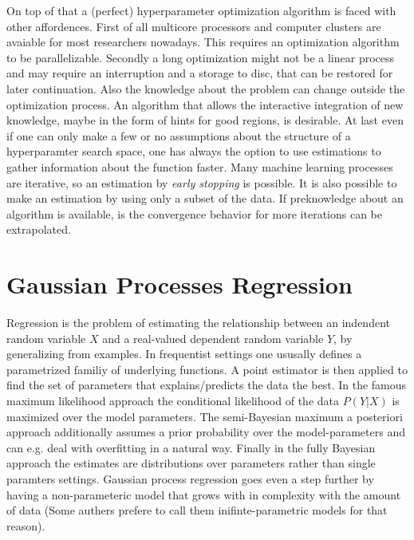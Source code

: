 \documentclass[english]{article}
\begin{document}
On top of that a (perfect) hyperparameter optimization algorithm is faced with other affordences. First of all multicore processors and computer clusters are avaiable for most researchers nowadays. This requires an optimization algorithm to be parallelizable. Secondly a long optimization might not be a linear process and may require an interruption and a storage to disc, that can be restored for later continuation. Also the knowledge about the problem can change outside the optimization process. An algorithm that allows the interactive integration of new knowledge, maybe in the form of hints for good regions, is desirable.
At last even if one can only make a few or no assumptions about the structure of a hyperparamter search space, one has always the option to use estimations to gather information about the function faster. Many machine learning processes are iterative, so an estimation by \textit{early stopping} is possible. It is also possible to make an estimation by using only a subset of the data. If preknowledge about an algorithm is available, is the convergence behavior for more iterations can be extrapolated.



\section{Gaussian Processes Regression}
\label{GPR}
Regression is the problem of estimating the relationship between an indendent random variable $X$ and a real-valued dependent random variable $Y$, by generalizing from examples. In frequentist settings one ususally defines a parametrized familiy of underlying functions. A point estimator is then applied to find the set of parameters that explains/predicts the data the best. In the famous maximum likelihood approach the conditional likelihood of the data $P(Y|X)$ is maximized over the model parameters. The semi-Bayesian maximum a posteriori approach additionally assumes a prior probability over the model-parameters and can e.g. deal with overfitting in a natural way. Finally in the fully Bayesian approach the estimates are distributions over parameters rather than single paramters settings. Gaussian process regression goes even a step further by having a non-parameteric model that grows with in complexity with the amount of data (Some authers prefere to call them inifinte-parametric models for that reason).
\end{document}
